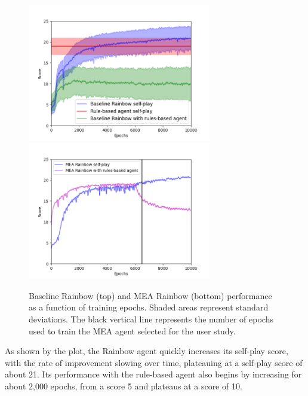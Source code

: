 \documentclass[letterpaper]{article} %
\begin{document}
\begin{figure}[t]
    \centering
    \includegraphics[width=8cm]{baseline.png}
    \includegraphics[width=8cm]{mixed.png}
    \caption{Baseline Rainbow (top) and MEA  Rainbow (bottom)   performance as a function of training   epochs. Shaded areas represent standard deviations. The black vertical line represents the number of epochs used to train the MEA agent selected for the user study.
    }
    \label{fig:performance}
\end{figure}

As shown by the plot, the Rainbow agent quickly increases its self-play score, with the rate of improvement slowing over time, plateauing at a self-play score of about 21. Its performance  with the rule-based agent also begins by increasing for about 2,000 epochs,   from a score 5   and plateaus at a score of 10.
\end{document}
